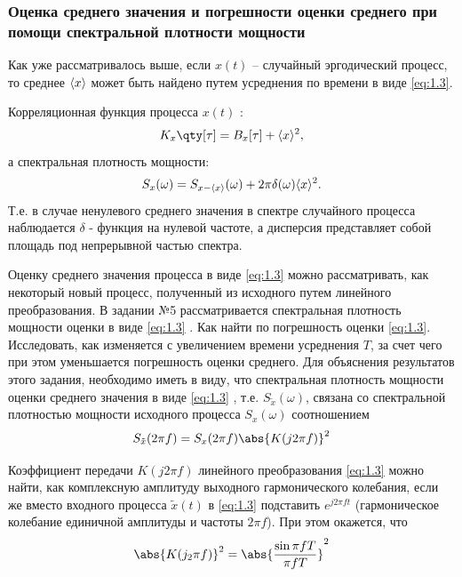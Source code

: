 \subsubsection{Оценка среднего значения и погрешности оценки среднего при помощи спектральной 
	плотности мощности}%

Как уже рассматривалось выше, если $x(t)$ -- случайный эргодический процесс, то среднее
$\langle x\rangle$ может быть найдено путем усреднения по времени в виде \eqref{eq:1.3}.

Корреляционная функция процесса $x(t)$ :
\begin{equation}
\label{eq:}
K_x\qty[\tau] = B_x[\tau] + \mean{x}^2,
\end{equation}
а спектральная плотность мощности:
\begin{equation}
\label{eq:}
S_x(\omega) = S_{x-\langle x\rangle}(\omega) + 2 \pi \delta(\omega) \langle x\rangle^2.
\end{equation}
Т.е. в случае ненулевого среднего значения в спектре случайного процесса наблюдается $\delta$ - 
функция на нулевой частоте, а дисперсия представляет собой площадь под непрерывной частью спектра.

Оценку среднего значения процесса в виде \eqref{eq:1.3}  можно рассматривать, как некоторый новый процесс,
полученный из исходного путем линейного преобразования. В задании №5 рассматривается спектральная плотность мощности  оценки  в виде \eqref{eq:1.3} . Как найти по  погрешность оценки \eqref{eq:1.3}. Исследовать, как изменяется  с увеличением времени усреднения $T$, за счет чего при этом уменьшается погрешность оценки среднего.
Для объяснения результатов этого задания, необходимо иметь в виду, что спектральная плотность мощности оценки среднего значения в виде \eqref{eq:1.3} , т.е. $S_{\tilde x}(\omega)$, связана со спектральной плотностью мощности исходного процесса $S_x(\omega)$  соотношением
\begin{equation}
\label{eq:4.1}
S_{\tilde x}(2 \pi f) = S_x(2 \pi f) \abs{K(j 2 \pi f)}^2
\end{equation}

Коэффициент передачи  $K(j 2 \pi f)$ линейного преобразования \eqref{eq:1.3}  можно найти, как комплексную амплитуду выходного гармонического колебания, если же вместо входного 
процесса  $\tilde x(t)$ в \eqref{eq:1.3}  подставить $e^{j 2 \pi f t}$ (гармоническое колебание единичной амплитуды и частоты $2 \pi f$). При этом окажется, что 
\begin{equation}
\label{eq:4.2}
\abs{K(j_{2} \pi f)}^2 = \abs{\frac{\sin{\pi f T}}{\pi f T}}^2
\end{equation}

